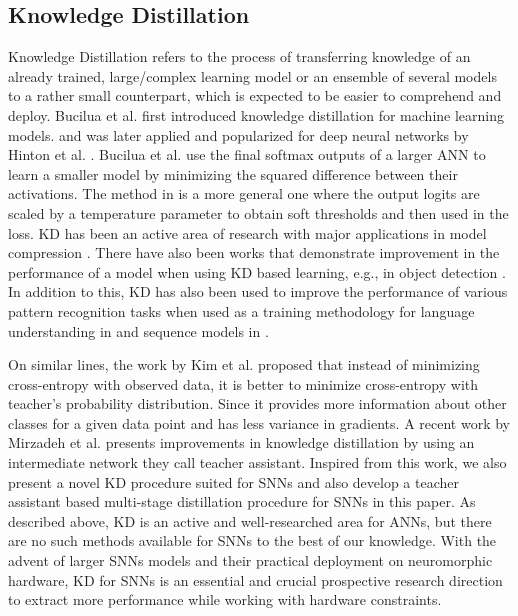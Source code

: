\documentclass{article}
\begin{document}
\subsection{Knowledge Distillation}
Knowledge Distillation refers to the process of transferring knowledge of an already trained, large/complex learning model or an ensemble of several models to a rather small counterpart, which is expected to be easier to comprehend and deploy. Bucilua et al. first introduced knowledge distillation for machine learning models. \cite{bucilua2006model} and was later applied and popularized for deep neural networks by Hinton et al. \cite{hinton2015distilling}. Bucilua et al. \cite{bucilua2006model} use the final softmax outputs of a larger ANN to learn a smaller model by minimizing the squared difference between their activations. The method in \cite{hinton2015distilling} is a more general one where the output logits are scaled by a temperature parameter to obtain soft thresholds and then used in the loss. KD has been an active area of research with major applications in model compression \cite{cheng2017survey}. There have also been works that demonstrate improvement in the performance of a model when using KD based learning, e.g., in object detection \cite{chen2017learning}. In addition to this, KD has also been used to improve the performance of various pattern recognition tasks when used as a training methodology for language understanding in \cite{liu2019improving} and sequence models in \cite{huang2018knowledge}.

On similar lines, the work by Kim et al. \cite{kim2016sequence} proposed that instead of minimizing cross-entropy with observed data, it is better to minimize cross-entropy with teacher's probability distribution. Since it provides more information about other classes for a given data point and has less variance in gradients. A recent work by Mirzadeh et al. \cite{mirzadeh2019improved} presents improvements in knowledge distillation by using an intermediate network they call teacher assistant. Inspired from this work, we also present a novel KD procedure suited for SNNs and also develop a teacher assistant based multi-stage distillation procedure for SNNs in this paper. As described above, KD is an active and well-researched area for ANNs, but there are no such methods available for SNNs to the best of our knowledge. With the advent of larger SNNs models and their practical deployment on neuromorphic hardware, KD for SNNs is an essential and crucial prospective research direction to extract more performance while working with hardware constraints.
\end{document}

